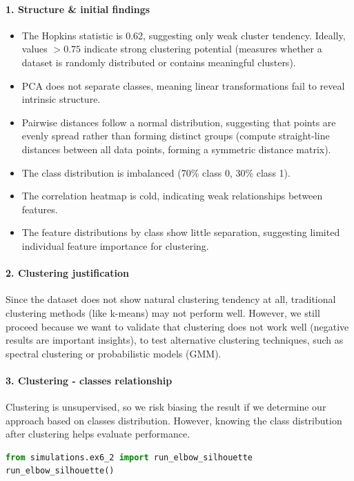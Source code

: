 \documentclass[11pt,a4paper]{article}
\begin{document}
\paragraph{1. Structure \& initial findings}
\begin{itemize}
    \item The Hopkins statistic is 0.62, suggesting only weak cluster tendency. Ideally, values $> 0.75$ indicate strong clustering potential (measures whether a dataset is randomly distributed or contains meaningful clusters).
    \item PCA does not separate classes, meaning linear transformations fail to reveal intrinsic structure.
    \item Pairwise distances follow a normal distribution, suggesting that points are evenly spread rather than forming distinct groups (compute straight-line distances between all data points, forming a symmetric distance matrix).
    \item The class distribution is imbalanced (70\% class 0, 30\% class 1).
    \item The correlation heatmap is cold, indicating weak relationships between features.
    \item The feature distributions by class show little separation, suggesting limited individual feature importance for clustering.
\end{itemize}

\paragraph{2. Clustering justification}
Since the dataset does not show natural clustering tendency at all, traditional clustering methods (like k-means) may not perform well. However, we still proceed because we want to validate that clustering does not work well (negative results are important insights), to test alternative clustering techniques, such as spectral clustering or probabilistic models (GMM).

\paragraph{3. Clustering - classes relationship}
Clustering is unsupervised, so we risk biasing the result if we determine our approach based on classes distribution. However, knowing the class distribution after clustering helps evaluate performance.

\begin{lstlisting}[language=Python]
from simulations.ex6_2 import run_elbow_silhouette
run_elbow_silhouette()
\end{lstlisting}
\end{document}

